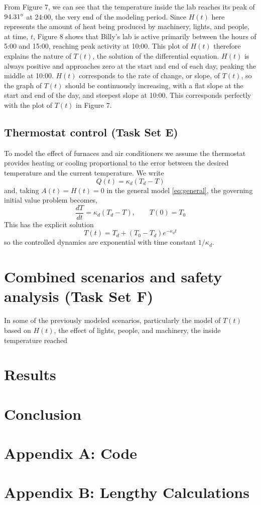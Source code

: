 \documentclass[12pt]{article}
\begin{document}
From Figure 7, we can see that the temperature inside the lab reaches its peak of $94.31\degree$ at 24:00, the very end of the modeling period. Since $H(t)$ here represents the amount of heat being produced by machinery, lights, and people, at time, $t$, Figure 8 shows that Billy's lab is active primarily between the hours of 5:00 and 15:00, reaching peak activity at 10:00. This plot of $H(t)$ therefore explains the nature of $T(t)$, the solution of the differential equation. $H(t)$ is always positive and approaches zero at the start and end of each day, peaking the middle at 10:00. $H(t)$ corresponds to the rate of change, or slope, of $T(t)$, so the graph of $T(t)$ should be continuously increasing, with a flat slope at the start and end of the day, and steepest slope at 10:00. This corresponds perfectly with the plot of $T(t)$ in Figure 7.

\subsection{Thermostat control (Task Set E)}
To model the effect of furnaces and air conditioners we assume the thermostat provides heating or cooling proportional to the error between the desired temperature and the current temperature. We write
\begin{equation}
Q(t)=\kappa_d(T_d-T)
\label{Qthermostat}
\end{equation}
and, taking $A(t)=H(t)=0$ in the general model \eqref{eq:general}, the governing initial value problem becomes,
\begin{equation}
\frac{dT}{dt} = \kappa_d(T_d - T), \qquad T(0)=T_0
\label{eq:thermostat_ode}
\end{equation}
This has the explicit solution
\begin{equation}
T(t)=T_d+(T_0-T_d)e^{-\kappa_dt}
\label{eq:thermostat_solution}
\end{equation}
so the controlled dynamics are exponential with time constant $1/\kappa_d$.

\section{Combined scenarios and safety analysis (Task Set F)}
In some of the previously modeled scenarios, particularly the model of $T(t)$ based on $H(t)$, the effect of lights, people, and machinery, the inside temperature reached 
\clearpage
\section{Results}

\section{Conclusion}

\clearpage
\appendix
\section{Appendix A: Code}



\section{Appendix B: Lengthy Calculations}
\end{document}
